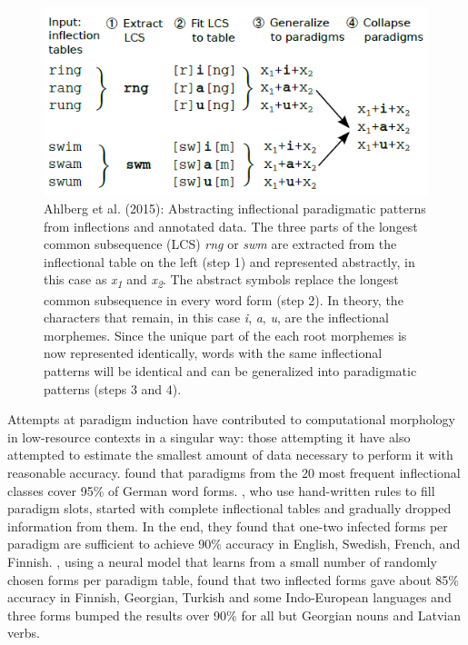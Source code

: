 \documentclass[12pt]{article}
\begin{document}
\begin{figure}[ht]
\begin{center}
\includegraphics[width=0.7\columnwidth]{Ahlberg2015-LCS.PNG}
\caption{Ahlberg et al. (2015): Abstracting inflectional paradigmatic patterns from inflections and annotated data.  The three parts of the longest common subsequence (LCS) \textit{rng} or \textit{swm} are extracted from the inflectional table on the left (step 1) and represented abstractly, in this case as \textit{x\textsubscript{1}} and \textit{x\textsubscript{2}}. The abstract symbols replace the longest common subsequence in every word form (step 2). In theory, the characters that remain, in this case \textit{i}, \textit{a}, \textit{u}, are the inflectional morphemes. Since the unique part of the each root morphemes is now represented identically, words with the same inflectional patterns will be identical and can be generalized into paradigmatic patterns (steps 3 and 4). }
\label{fig:LCS}
\end{center}
\end{figure}

Attempts at paradigm induction have contributed to computational morphology in low-resource contexts in a singular way: those attempting it have also attempted to estimate the smallest amount of data necessary to perform it with reasonable accuracy.  found that paradigms from the 20 most frequent inflectional classes cover 95\% of German word forms. , who use hand-written rules to fill paradigm slots, started with complete inflectional tables and gradually dropped information from them. In the end, they found that one-two infected forms per paradigm are sufficient to achieve 90\% accuracy in English, Swedish, French, and Finnish. , using a neural model that learns from a small number of randomly chosen forms per paradigm table, found that two inflected forms gave about 85\% accuracy in Finnish, Georgian, Turkish and some Indo-European languages and three forms bumped the results over 90\% for all but Georgian nouns and Latvian verbs.
\end{document}
